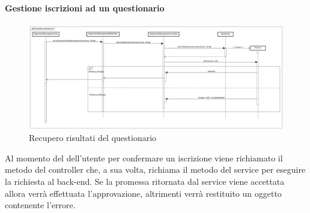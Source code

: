 \paragraph{Gestione iscrizioni ad un questionario}
\label{Gestione iscrizioni ad un questionario}

\begin{figure}[ht]
	\centering
	\includegraphics[scale=0.25,keepaspectratio]{UML/DiagrammiDiSequenza/Front-end/SubscriptionManagement.png}
	\caption{Recupero risultati del questionario}
\end{figure} \FloatBarrier
 
Al momento del dell'utente per confermare un iscrizione viene richiamato il metodo del controller che, a sua volta, richiama il metodo del service per eseguire la richiesta al back-end. Se la promessa ritornata dal service viene accettata allora verrà effettuata l'approvazione, altrimenti verrà restituito un oggetto contenente l'errore.

